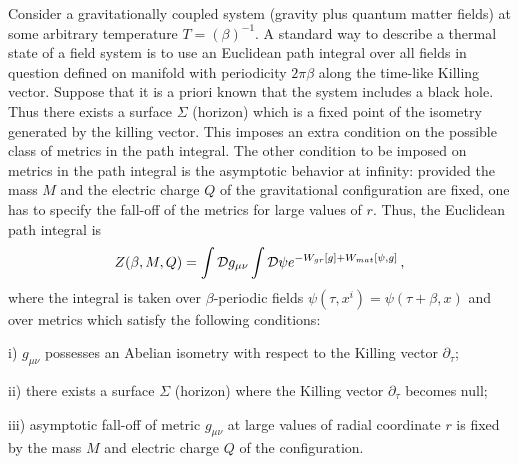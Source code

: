 \documentclass[12pt]{article}
\def\be{\begin{eqnarray}}
\def\ee{\end{eqnarray}}
\def\lb{\label}
\begin{document}
 Consider a gravitationally coupled  system (gravity plus quantum matter fields)
at some arbitrary temperature $T=(\beta)^{-1}$. A standard way to describe a thermal state of a field system is to use an Euclidean
path integral over  all fields in question
defined on manifold with  periodicity $2\pi\beta$ along the time-like Killing vector.
Suppose that it is a priori known that the system includes a black hole. Thus there exists a 
 surface $\Sigma$
(horizon) which is a fixed point of the isometry generated by the killing vector.  This  imposes an extra condition on the possible class of metrics in the
path integral. The other condition to be imposed on  metrics in the path integral 
is the asymptotic behavior  at infinity: provided   the mass $M$ and the electric charge $Q$ of the gravitational configuration are fixed, one has to specify the fall-off of the metrics for large values of $r$. Thus, the Euclidean path integral is
\be
Z(\beta, M,Q)=\int{\cal D}g_{\mu\nu}\int {\cal D\psi} e^{-W_{gr}[g]+W_{mat}[\psi, g]}\, ,
\lb{functional integral}
\ee
where the integral is taken over $\beta$-periodic fields $\psi(\tau,x^i)=\psi(\tau+\beta,x)$ and over  metrics which satisfy the  following conditions:

\medskip

\noindent i) $g_{\mu\nu}$ possesses an Abelian isometry  with respect to the Killing vector $\partial_\tau$;

\medskip

\noindent  ii) there exists a surface $\Sigma$ (horizon) where the Killing vector $\partial_\tau$ becomes null; 

\medskip

\noindent iii) asymptotic fall-off of metric $g_{\mu\nu}$ at large values of radial coordinate $r$ is fixed by the mass $M$ and electric charge $Q$ of the configuration. 

\medskip
\end{document}
